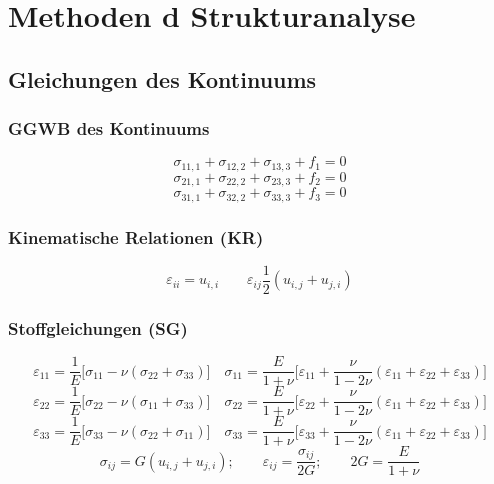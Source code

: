 \section{Methoden d Strukturanalyse}
    \subsection{Gleichungen des Kontinuums}
        \subsubsection{GGWB des Kontinuums}
            \small
            \[\sigma_{11,1} + \sigma_{12,2} + \sigma_{13,3} + f_1 = 0\]
            \[\sigma_{21,1} + \sigma_{22,2} + \sigma_{23,3} + f_2 = 0\]
            \[\sigma_{31,1} + \sigma_{32,2} + \sigma_{33,3} + f_3 = 0\]
            
        \subsubsection{Kinematische Relationen (KR)}
            \[\varepsilon_{ii}=u_{i,i} \qquad \varepsilon_{ij}\frac{1}{2}(u_{i,j}+u_{j,i})\]

        \subsubsection{Stoffgleichungen (SG)}
            \[\varepsilon_{11} = \frac{1}{E}\lbrack\sigma_{11} - \nu(\sigma_{22} + \sigma_{33})\rbrack \quad \sigma_{11}=\frac{E}{1+\nu}\lbrack\varepsilon_{11}+\frac{\nu}{1-2\nu}(\varepsilon_{11}+\varepsilon_{22}+\varepsilon_{33})\rbrack\]
            \[\varepsilon_{22} = \frac{1}{E}\lbrack\sigma_{22} - \nu(\sigma_{11} + \sigma_{33})\rbrack \quad \sigma_{22}=\frac{E}{1+\nu}\lbrack\varepsilon_{22}+\frac{\nu}{1-2\nu}(\varepsilon_{11}+\varepsilon_{22}+\varepsilon_{33})\rbrack\]
            \[\varepsilon_{33} = \frac{1}{E}\lbrack\sigma_{33} - \nu(\sigma_{22} + \sigma_{11})\rbrack \quad \sigma_{33}=\frac{E}{1+\nu}\lbrack\varepsilon_{33}+\frac{\nu}{1-2\nu}(\varepsilon_{11}+\varepsilon_{22}+\varepsilon_{33})\rbrack\]
            \[\sigma_{ij}=G(u_{i,j}+u_{j,i});\qquad\varepsilon_{ij}=\frac{\sigma_{ij}}{2G}; \qquad 2G=\frac{E}{1+\nu}\]
            \normalsize

    